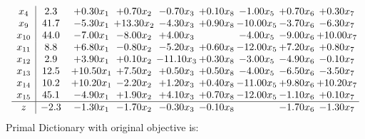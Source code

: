 \documentclass[9pt]{article}
\begin{document}
\[\begin{array}{c| c c@{\hskip 2pt} c@{\hskip 2pt} c@{\hskip 2pt} c@{\hskip 2pt} c@{\hskip 2pt} c@{\hskip 2pt} c@{\hskip 2pt} }
 x_{4}   &  2.3 & +  0.30 x_{1} & +  0.70 x_{2} & -0.70 x_{3} & +  0.10 x_{8} & -1.00 x_{5} & +  0.70 x_{6} & +  0.30 x_{7}\\
 x_{9}   &  41.7 & -5.30 x_{1} & + 13.30 x_{2} & -4.30 x_{3} & +  0.90 x_{8} & -10.00 x_{5} & -3.70 x_{6} & -6.30 x_{7}\\
 x_{10}   &  44.0 & -7.00 x_{1} & -8.00 x_{2} & +  4.00 x_{3} &   & -4.00 x_{5} & -9.00 x_{6} & + 10.00 x_{7}\\
 x_{11}   &  8.8 & +  6.80 x_{1} & -0.80 x_{2} & -5.20 x_{3} & +  0.60 x_{8} & -12.00 x_{5} & +  7.20 x_{6} & +  0.80 x_{7}\\
 x_{12}   &  2.9 & +  3.90 x_{1} & +  0.10 x_{2} & -11.10 x_{3} & +  0.30 x_{8} & -3.00 x_{5} & -4.90 x_{6} & -0.10 x_{7}\\
 x_{13}   &  12.5 & + 10.50 x_{1} & +  7.50 x_{2} & +  0.50 x_{3} & +  0.50 x_{8} & -4.00 x_{5} & -6.50 x_{6} & -3.50 x_{7}\\
 x_{14}   &  10.2 & + 10.20 x_{1} & -2.20 x_{2} & +  1.20 x_{3} & +  0.40 x_{8} & -11.00 x_{5} & +  9.80 x_{6} & + 10.20 x_{7}\\
 x_{15}   &  45.1 & -4.90 x_{1} & +  1.90 x_{2} & +  4.10 x_{3} & +  0.70 x_{8} & -12.00 x_{5} & -1.10 x_{6} & +  0.10 x_{7}\\
\hline
z    &  -2.3 & -1.30 x_{1} & -1.70 x_{2} & -0.30 x_{3} & -0.10 x_{8} &   & -1.70 x_{6} & -1.30 x_{7}\\
\end{array}\]
Primal Dictionary with original objective is:
\end{document}
